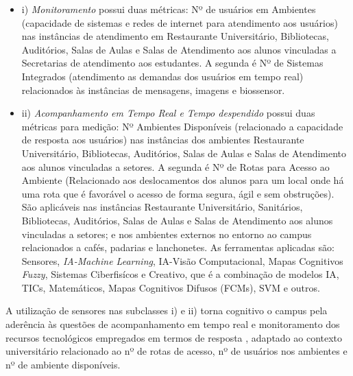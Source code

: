 \documentclass[portuguese]{textolivre}
\begin{document}
\medskip
\begin{itemize}
\item i) \textit{Monitoramento} possui duas métricas: Nº de usuários em Ambientes (capacidade de sistemas e redes de internet para atendimento aos usuários) nas instâncias de atendimento em Restaurante Universitário, Bibliotecas, Auditórios, Salas de Aulas e Salas de Atendimento aos alunos vinculadas a Secretarias de atendimento aos estudantes. A segunda é Nº de Sistemas Integrados (atendimento as demandas dos usuários em tempo real) relacionados às instâncias de mensagens, imagens e biossensor.
\item ii) \textit{Acompanhamento em Tempo Real e Tempo despendido} possui duas métricas para medição: Nº Ambientes Disponíveis (relacionado a capacidade de resposta aos usuários) nas instâncias dos ambientes Restaurante Universitário, Bibliotecas, Auditórios, Salas de Aulas e Salas de Atendimento aos alunos vinculadas a setores. A segunda é Nº de Rotas para Acesso ao Ambiente (Relacionado aos deslocamentos dos alunos para um local onde há uma rota que é favorável o acesso de forma segura, ágil e sem obstruções). São aplicáveis nas instâncias Restaurante Universitário, Sanitários, Bibliotecas, Auditórios, Salas de Aulas e Salas de Atendimento aos alunos vinculadas a setores; e nos ambientes externos no entorno ao campus relacionados a cafés, padarias e lanchonetes. As ferramentas aplicadas são: Sensores, \textit{IA-Machine Learning}, IA-Visão Computacional, Mapas Cognitivos \textit{Fuzzy}, Sistemas Ciberfisícos e Creativo, que é a combinação de modelos IA, TICs, Matemáticos, Mapas Cognitivos Difusos (FCMs), SVM e outros. 
\end{itemize}
\medskip

A utilização de sensores nas subclasses i) e ii) torna cognitivo o campus pela aderência às questões de acompanhamento em tempo real e monitoramento dos recursos tecnológicos empregados em termos de resposta \cite{somov2013, singh2014, daniel2021}, adaptado ao contexto universitário relacionado ao nº de rotas de acesso, nº de usuários nos ambientes e nº de ambiente disponíveis.
\end{document}
